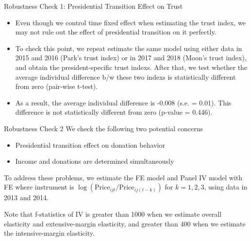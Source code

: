 \documentclass[
  ignorenonframetext,
]{beamer}
\providecommand{\tightlist}{%
  \setlength{\itemsep}{0pt}\setlength{\parskip}{0pt}}
\begin{document}
\begin{frame}{Robustness Check 1: Presidential Transition Effect on Trust}
\protect\hypertarget{robustness-check-1-presidential-transition-effect-on-trust}{}
\begin{itemize}
\tightlist
\item
  Even though we control time fixed effect when estimating the trust index, we may not rule out the effect of presidential transition on it perfectly.
\item
  To check this point, we repeat estimate the same model using either data in 2015 and 2016 (Park's trust index) or in 2017 and 2018 (Moon's trust index), and obtain the president-specific trust indexs. After that, we test whether the average individual difference b/w these two indexs is statistically different from zero (pair-wise t-test).
\item
  As a result, the average individual difference is -0.008 (s.e. = 0.01). This difference is not statistically different from zero (p-value = 0.446).
\end{itemize}
\end{frame}

\begin{frame}{Robustness Check 2}
\protect\hypertarget{robustness-check-2-1}{}
We check the following two potential concerns

\begin{itemize}
\tightlist
\item
  Presidential transition effect on donation behavior
\item
  Income and donations are determined simultaneously
\end{itemize}

To address these problems, we estimate the FE model and Panel IV model with FE where instrument is \(\log(\text{Price}_{ijt}/\text{Price}_{ij(t-k)})\) for \(k = 1, 2, 3\), using data in 2013 and 2014.

Note that f-statistics of IV is greater than 1000 when we estimate overall elasticity and extensive-margin elasticity, and greater than 400 when we estimate the intensive-margin elasticity.
\end{frame}
\end{document}
